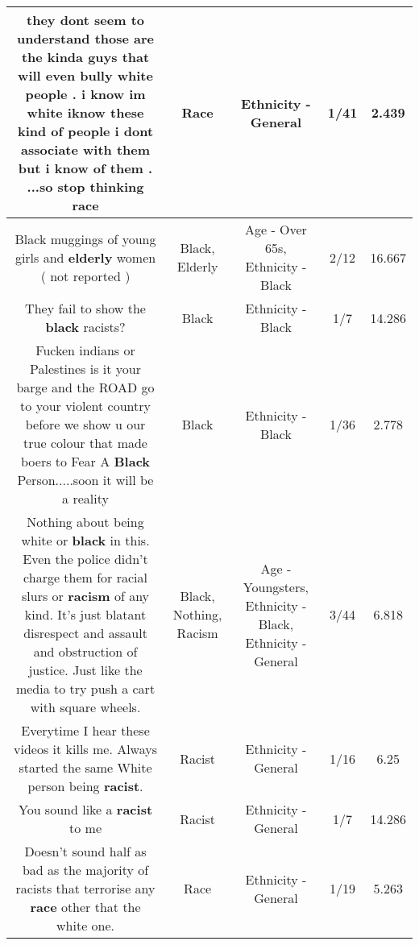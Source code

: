 \documentclass[11pt]{article}
\newlength\mylength
\begin{document}
\begin{center}
\begin{longtable}{|C{.65\mylength}|C{.30\mylength}|C{.12\mylength}|C{.12\mylength}|C{.12\mylength}|}
  \small they dont seem to understand those are the kinda guys that will even bully white people . i know im white  iknow these kind  of people   i dont associate with them but i know of them . ...so stop thinking race\normalsize   & Race & Ethnicity - General & 1/41 & 2.439 \\  \hline
  \small Black muggings of young girls and \textbf{elderly} women ( not reported )\normalsize   & Black, Elderly & Age - Over 65s, Ethnicity - Black & 2/12 & 16.667 \\  \hline
  \small They fail to show the \textbf{black} racists?\normalsize   & Black & Ethnicity - Black & 1/7 & 14.286 \\  \hline
  \small Fucken indians or Palestines is it your barge and the ROAD go to your violent country before we show u our true colour that made boers to Fear A \textbf{Black} Person.....soon it will be a reality\normalsize   & Black & Ethnicity - Black & 1/36 & 2.778 \\  \hline
  \small Nothing about being white or \textbf{black} in this. Even the police didn't charge them for racial slurs or \textbf{racism} of any kind. It's just blatant disrespect and assault and obstruction of justice. Just like the media to try push a cart with square wheels.\normalsize   & Black, Nothing, Racism & Age - Youngsters, Ethnicity - Black, Ethnicity - General & 3/44 & 6.818 \\  \hline
  \small Everytime I hear these videos it kills me. Always started the same White person being \textbf{racist}.\normalsize   & Racist & Ethnicity - General & 1/16 & 6.25 \\  \hline
  \small You sound like a \textbf{racist} to me\normalsize   & Racist & Ethnicity - General & 1/7 & 14.286 \\  \hline
  \small Doesn't sound half as bad as the majority of racists that terrorise any \textbf{race} other that the white one.\normalsize   & Race & Ethnicity - General & 1/19 & 5.263 \\  \hline

\end{longtable}
\end{center}
\end{document}

